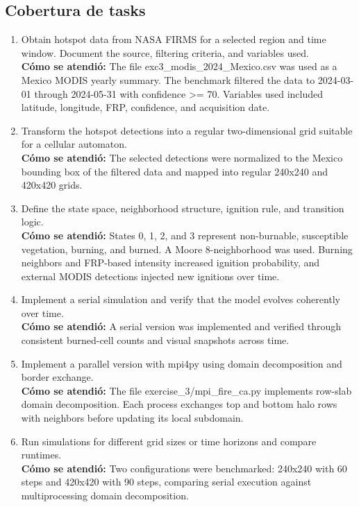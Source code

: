 \documentclass[11pt]{article}
\begin{document}
\subsection*{Cobertura de tasks}
\begin{enumerate}[leftmargin=*]
\item Obtain hotspot data from NASA FIRMS for a selected region and time window. Document the source, filtering criteria, and variables used.\\
\textbf{Cómo se atendió:} The file exc3\_modis\_2024\_Mexico.csv was used as a Mexico MODIS yearly summary. The benchmark filtered the data to 2024-03-01 through 2024-05-31 with confidence >= 70. Variables used included latitude, longitude, FRP, confidence, and acquisition date.
\item Transform the hotspot detections into a regular two-dimensional grid suitable for a cellular automaton.\\
\textbf{Cómo se atendió:} The selected detections were normalized to the Mexico bounding box of the filtered data and mapped into regular 240x240 and 420x420 grids.
\item Define the state space, neighborhood structure, ignition rule, and transition logic.\\
\textbf{Cómo se atendió:} States 0, 1, 2, and 3 represent non-burnable, susceptible vegetation, burning, and burned. A Moore 8-neighborhood was used. Burning neighbors and FRP-based intensity increased ignition probability, and external MODIS detections injected new ignitions over time.
\item Implement a serial simulation and verify that the model evolves coherently over time.\\
\textbf{Cómo se atendió:} A serial version was implemented and verified through consistent burned-cell counts and visual snapshots across time.
\item Implement a parallel version with mpi4py using domain decomposition and border exchange.\\
\textbf{Cómo se atendió:} The file exercise\_3/mpi\_fire\_ca.py implements row-slab domain decomposition. Each process exchanges top and bottom halo rows with neighbors before updating its local subdomain.
\item Run simulations for different grid sizes or time horizons and compare runtimes.\\
\textbf{Cómo se atendió:} Two configurations were benchmarked: 240x240 with 60 steps and 420x420 with 90 steps, comparing serial execution against multiprocessing domain decomposition.

\end{enumerate}
\end{document}
